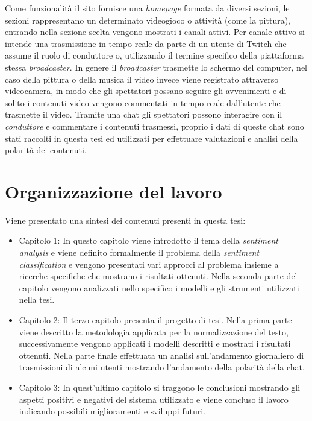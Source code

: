 \documentclass[a4paper,12pt,openright,twoside]{report}
\theoremstyle{definition}
\begin{document}
Come funzionalità il sito fornisce una \emph{homepage} formata da diversi sezioni, le sezioni rappresentano
un determinato videogioco o attività (come la pittura), entrando nella sezione scelta vengono
mostrati i canali attivi. Per canale attivo si intende una trasmissione in tempo reale da parte di un 
utente di Twitch che assume il ruolo di conduttore o, utilizzando il termine specifico della piattaforma stessa 
\emph{broadcaster}. In genere il \emph{broadcaster} trasmette lo schermo del computer,
nel caso della pittura o della musica il video invece viene registrato attraverso videocamera, in modo che gli
spettatori possano seguire gli avvenimenti e di solito i contenuti video vengono commentati in tempo reale
dall'utente che trasmette il video.
Tramite una chat gli spettatori possono interagire con il \emph{conduttore} e commentare i contenuti
trasmessi, proprio i dati di queste chat sono stati raccolti in questa tesi ed utilizzati per effettuare
valutazioni e analisi della polarità dei contenuti.

\section*{Organizzazione del lavoro}
Viene presentato una sintesi dei contenuti presenti in questa tesi:
\begin{itemize}
\item Capitolo 1: In questo capitolo viene introdotto il tema della \emph{sentiment analysis} e
viene definito formalmente il problema della \emph{sentiment classification} e vengono presentati vari approcci al problema insieme a ricerche specifiche
che mostrano i risultati ottenuti.
Nella seconda
parte del capitolo vengono analizzati nello specifico i modelli e gli strumenti utilizzati nella tesi.
\item Capitolo 2: Il terzo capitolo presenta il progetto di tesi. Nella prima parte viene descritto
la metodologia applicata per la normalizzazione del testo, successivamente vengono applicati i modelli
descritti e mostrati i risultati ottenuti. Nella parte finale effettuata un analisi sull'andamento
giornaliero di trasmissioni di alcuni utenti mostrando l'andamento della polarità della chat.
\item Capitolo 3: In quest'ultimo capitolo si traggono le conclusioni mostrando gli aspetti positivi e negativi
del sistema utilizzato e viene concluso il lavoro indicando possibili miglioramenti e sviluppi futuri.
\end{itemize}       %
\end{document}
